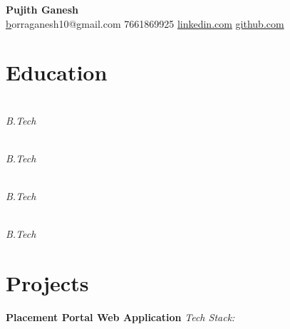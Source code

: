 \documentclass[a4paper,10pt]{article}
\begin{document}
\begin{center}
    {\huge \textbf{ Pujith Ganesh }} \\
    \vspace{5pt}
    \small \href{mailto:borraganesh10@gmail.com } borraganesh10@gmail.com \quad \textbullet{} 7661869925 \quad  \quad \textbullet{} \href{ https://www.linkedin.com/in/ganesh10-/ }{linkedin.com} \quad \textbullet{} \href{ https://github.com/ganesh10-code }{github.com}
\end{center}

\section*{Education}

\noindent
\textbf{  } \\
\textit{ B.Tech } \hfill \textit{  } \\

\vspace{0.3cm}

\noindent
\textbf{  } \\
\textit{ B.Tech } \hfill \textit{  } \\

\vspace{0.3cm}

\noindent
\textbf{  } \\
\textit{ B.Tech } \hfill \textit{  } \\

\vspace{0.3cm}

\noindent
\textbf{  } \\
\textit{ B.Tech } \hfill \textit{  } \\

\vspace{0.3cm}



\section*{Projects}

\noindent
\textbf{ Placement Portal Web Application } \hfill \textit{Tech Stack:  } \\
\vspace{5pt} \textit{  }
\begin{compactitem}
    \item 
\end{compactitem}
\end{document}
